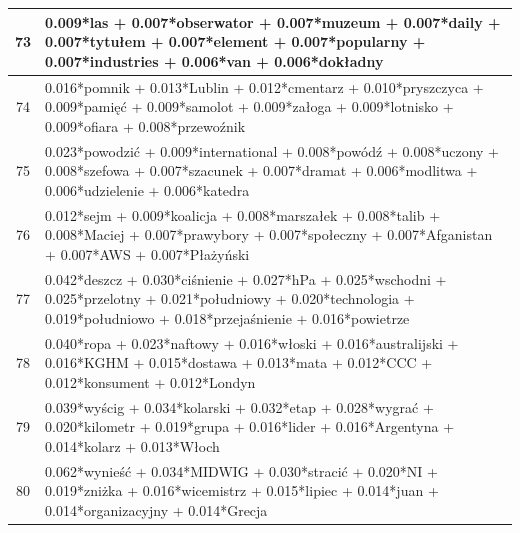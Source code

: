 \documentclass[11pt,a4paper]{article}
\begin{document}
\begin{table}[h]
\begin{tabular}{|c|>{\footnotesize}p{\linewidth}|}
73 & 0.009*las + 0.007*obserwator + 0.007*muzeum + 0.007*daily + 0.007*tytułem + 0.007*element + 0.007*popularny + 0.007*industries + 0.006*van + 0.006*dokładny\\\hline
74 & 0.016*pomnik + 0.013*Lublin + 0.012*cmentarz + 0.010*pryszczyca + 0.009*pamięć + 0.009*samolot + 0.009*załoga + 0.009*lotnisko + 0.009*ofiara + 0.008*przewoźnik\\\hline
75 & 0.023*powodzić + 0.009*international + 0.008*powódź + 0.008*uczony + 0.008*szefowa + 0.007*szacunek + 0.007*dramat + 0.006*modlitwa + 0.006*udzielenie + 0.006*katedra\\\hline
76 & 0.012*sejm + 0.009*koalicja + 0.008*marszałek + 0.008*talib + 0.008*Maciej + 0.007*prawybory + 0.007*społeczny + 0.007*Afganistan + 0.007*AWS + 0.007*Płażyński\\\hline
77 & 0.042*deszcz + 0.030*ciśnienie + 0.027*hPa + 0.025*wschodni + 0.025*przelotny + 0.021*południowy + 0.020*technologia + 0.019*południowo + 0.018*przejaśnienie + 0.016*powietrze\\\hline
78 & 0.040*ropa + 0.023*naftowy + 0.016*włoski + 0.016*australijski + 0.016*KGHM + 0.015*dostawa + 0.013*mata + 0.012*CCC + 0.012*konsument + 0.012*Londyn\\\hline
79 & 0.039*wyścig + 0.034*kolarski + 0.032*etap + 0.028*wygrać + 0.020*kilometr + 0.019*grupa + 0.016*lider + 0.016*Argentyna + 0.014*kolarz + 0.013*Włoch\\\hline
80 & 0.062*wynieść + 0.034*MIDWIG + 0.030*stracić + 0.020*NI + 0.019*zniżka + 0.016*wicemistrz + 0.015*lipiec + 0.014*juan + 0.014*organizacyjny + 0.014*Grecja\\\hline

\end{tabular}
\end{table}
\end{document}
